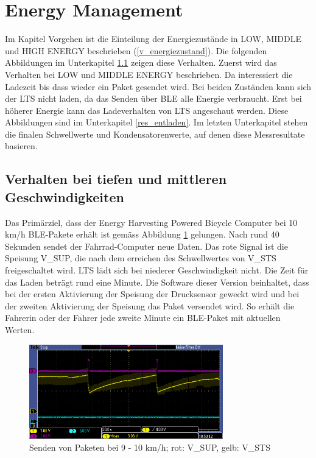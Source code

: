 \section{Energy Management}

Im Kapitel Vorgehen ist die Einteilung der Energiezustände in LOW, MIDDLE und HIGH ENERGY beschrieben (\ref{v_energiezustand}). Die folgenden Abbildungen im Unterkapitel \ref{tiefes_v} zeigen diese Verhalten. Zuerst wird das Verhalten bei LOW und MIDDLE ENERGY beschrieben. Da interessiert die Ladezeit bis dass wieder ein Paket gesendet wird. Bei beiden Zuständen kann sich der LTS nicht laden, da das Senden über BLE alle Energie verbraucht. Erst bei höherer Energie kann das Ladeverhalten von LTS angeschaut werden. Diese Abbildungen sind im Unterkapitel \ref{res_entladen}. Im letzten Unterkapitel stehen die finalen Schwellwerte und Kondensatorenwerte, auf denen diese Messresultate basieren.

\subsection{Verhalten bei tiefen und mittleren Geschwindigkeiten}
\label{tiefes_v}


Das Primärziel, dass der Energy Harvesting Powered Bicycle Computer bei 10 km/h BLE-Pakete erhält ist gemäss Abbildung \ref{paket_100kmh} gelungen. Nach rund 40 Sekunden sendet der Fahrrad-Computer neue Daten. Das rote Signal ist die Speisung V\_SUP, die nach dem erreichen des Schwellwertes von V\_STS freigeschaltet wird. LTS lädt sich bei niederer Geschwindigkeit nicht. Die Zeit für das Laden beträgt rund eine Minute. Die Software dieser Version beinhaltet, dass bei der ersten Aktivierung der Speisung der Drucksensor geweckt wird  und bei der zweiten Aktivierung der Speisung das Paket versendet wird. So erhält die Fahrerin oder der Fahrer jede zweite Minute ein BLE-Paket mit aktuellen Werten.\\

\clearpage
\begin{figure}[ht]
   \includegraphics[width=0.75\textwidth]{4Resultate/imag/pic_3.PNG}
    \caption{Senden von Paketen bei 9 - 10 km/h; rot: V\_SUP, gelb: V\_STS}
    \label{paket_100kmh}
\end{figure}

